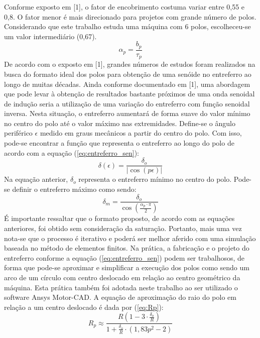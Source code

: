 \documentclass[conference]{IEEEtran}
\begin{document}
Conforme exposto em [1], o fator de encobrimento costuma variar entre 0,55 e 0,8. O fator menor é mais direcionado para projetos com grande número de polos. Considerando que este trabalho estuda uma máquina com 6 polos, escolheceu-se um valor intermediário (0,67).    
\begin{equation}
  \alpha_p = \frac{b_p}{\tau_p}
\label{eq:alpha_p}
\end{equation}
De acordo com o exposto em [1], grandes números de estudos foram realizados na busca do formato ideal dos polos para obtenção de uma senóide no entreferro ao longo de muitas décadas. Ainda conforme documentado em [1], uma abordagem que pode levar à obtenção de resultados bastante próximos de uma onda senoidal de indução seria a utilização de uma variação do entreferro com função senoidal inversa. Nesta situação, o entreferro aumentará de forma suave do valor mínimo no centro do polo até o valor máximo nas extremidades. Define-se o ângulo periférico $\epsilon$ medido em graus mecânicos a partir do centro do polo. Com isso, pode-se encontrar a função que representa o entreferro ao longo do polo de acordo com a equação (\ref{eq:entreferro_sen}):     
\begin{equation}
  \delta(\epsilon) = \frac{\delta_o}{|\cos(p\epsilon)|}
\label{eq:entreferro_sen}
\end{equation}
Na equação anterior, $\delta_o$ representa o entreferro mínimo no centro do polo. Pode-se definir o entreferro máximo como sendo:
\begin{equation}
  \delta_m = \frac{\delta_o}{\cos\left(\frac{\alpha_p \cdot \pi}{2}\right)}
\label{eq:entreferro_max}
\end{equation}
É importante ressaltar que o formato proposto, de acordo com as equações anteriores, foi obtido sem consideração da saturação. Portanto, mais uma vez nota-se que o processo é iterativo e poderá ser melhor aferido com uma simulação baseada no método de elementos finitos.
Na prática, a fabricação e o projeto do entreferro conforme a equação (\ref{eq:entreferro_sen}) podem ser trabalhosos, de forma que pode-se aproximar e simplificar a execução dos polos como sendo um arco de um círculo com centro deslocado em relação ao centro geométrico da máquina. Esta prática também foi adotada neste trabalho ao ser utilizado o software Ansys Motor-CAD. A equação de aproximação do raio do polo em relação a um centro deslocado é dada por (\ref{eq:Rp}):
\begin{equation}
  R_p \approx \frac{R \left(1 - 3 \cdot \frac{\delta_o}{R}\right)}{1 + \frac{\delta_o}{R} \cdot \left(1,83 p^2 - 2\right)}
\label{eq:Rp}
\end{equation}
\end{document}
